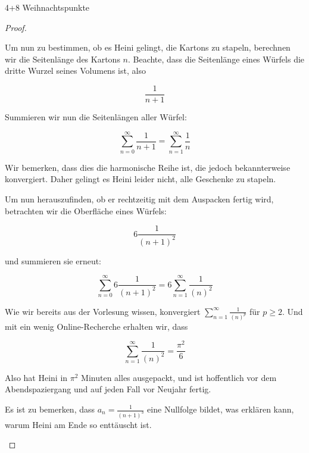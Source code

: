 \documentclass{problemset}
\begin{document}
\begin{problem}[Weihnachtsaufgaben*]{4+8 Weihnachtspunkte}
\begin{proof}
\begin{enumerate}
		      Um nun zu bestimmen, ob es Heini gelingt, die Kartons zu stapeln, berechnen wir
		      die Seitenlänge des Kartons $n$. Beachte, dass die Seitenlänge eines Würfels
		      die dritte Wurzel seines Volumens ist, also

		      \[
			      \frac{1}{n+1}
		      \]

		      Summieren wir nun die Seitenlängen aller Würfel:

		      \[
			      \sum_{n=0}^{\infty} \frac{1}{n+1} = \sum_{n=1}^{\infty} \frac{1}{n}
		      \]

		      Wir bemerken, dass dies die harmonische Reihe ist, die jedoch bekannterweise
		      konvergiert. Daher gelingt es Heini leider nicht, alle Geschenke zu stapeln.

		      Um nun herauszufinden, ob er rechtzeitig mit dem Auspacken fertig wird,
		      betrachten wir die Oberfläche eines Würfels:

		      \[
			      6 \frac{1}{{(n+1)}^2}
		      \]

		      und summieren sie erneut:

		      \[
			      \sum_{n=0}^{\infty} 6 \frac{1}{{(n+1)}^2} = 6 \sum_{n=1}^{\infty} \frac{1}{{(n)}^2}
		      \]

		      Wie wir bereits aus der Vorlesung wissen, konvergiert $\sum_{n=1}^{\infty}
			      \frac{1}{{(n)}^p}$ für $p \ge 2$. Und mit ein wenig Online-Recherche erhalten
		      wir, dass

		      \[
			      \sum_{n=1}^{\infty} \frac{1}{{(n)}^2} = \frac{\pi^2}{6}
		      \]

		      Also hat Heini in $\pi^2$ Minuten alles ausgepackt, und ist hoffentlich vor dem
		      Abendspaziergang und auf jeden Fall vor Neujahr fertig.

		      Es ist zu bemerken, dass $a_n = \frac{1}{{(n+1)}^3}$ eine Nullfolge bildet, was
		      erklären kann, warum Heini am Ende so enttäuscht ist.

	\end{enumerate}

\end{proof}
\end{problem}
\end{document}

